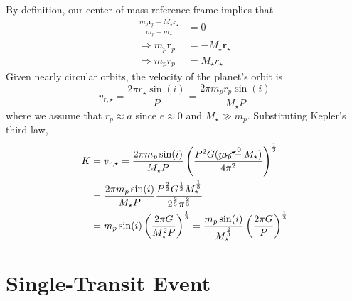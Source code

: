 \documentclass{article}
\begin{document}
By definition, our center-of-mass reference frame implies that
\begin{align}
    \frac{m_p \bm{r}_p + M_\star \bm{r}_\star}{m_p + m_\star} &= 0 \\
    \Rightarrow m_p \bm{r}_p &= -M_\star \bm{r}_\star \\
    \Rightarrow m_p r_p &= M_\star r_\star
\end{align}
Given nearly circular orbits, the velocity of the planet's orbit is
\begin{equation}
    v_{r, \star} = \frac{2 \pi r_\star \sin(i)}{P} = \frac{2 \pi m_p r_p \sin(i)}{M_\star P}
\end{equation}
where we assume that \(r_p \approx a\) since \(e \approx 0\) and \(M_\star \gg m_p\).
Substituting Kepler's third law,
\begin{align}
    K &= v_{r, \star} = \frac{2 \pi m_p \sin(i)}{M_\star P} \left(\frac{P^2 G (\cancelto{0}{m_p} + M_\star)}{4 \pi^2}\right)^\frac{1}{3} \\
    &= \frac{2 \pi m_p \sin(i)}{M_\star P} \frac{P^{\frac{2}{3}} G^{\frac{1}{3}} M_\star^{\frac{1}{3}}}{2^\frac{2}{3} \pi^{\frac{2}{3}}} \\
    &= m_p \sin(i) \left(\frac{2 \pi G}{M_\star^2 P}\right)^{\frac{1}{3}} = \frac{m_p \sin(i)}{M_\star^{\frac{2}{3}}} \left(\frac{2 \pi G}{P}\right)^{\frac{1}{3}}
\end{align}

\section{Single-Transit Event}

\subsection{}
\end{document}
